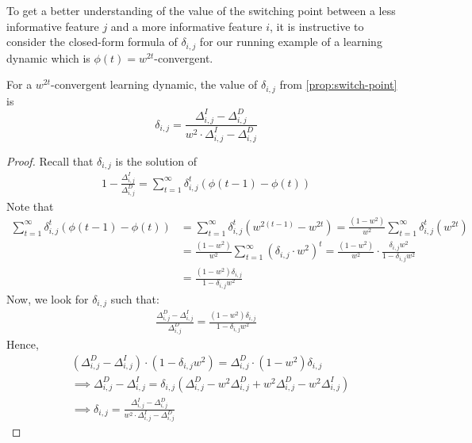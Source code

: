 To get a better understanding of the value of the switching point between a less informative feature $j$ and a more informative feature $i$, it is instructive to consider the closed-form formula of $\delta_{i,j}$ for our running example of a learning dynamic which is $\phi(t) = w^{2t}$-convergent. 

\begin{claim} \label{clm:educating-two-features}
For a $w^{2t}$-convergent learning dynamic, the value of $\delta_{i,j}$ from \cref{prop:switch-point} is
$$
 \delta_{i,j} 
 = 
 \frac{\Delta^I_{i,j} - \Delta^D_{i,j}}
 {w^2 \cdot \Delta^I_{i,j} - \Delta^D_{i,j}}
 $$
\end{claim}

\begin{proof}
Recall that $\delta_{i,j}$ is the solution of
\begin{align*} 
   1- \frac{\Delta^I_{i,j}}{\Delta^D_{i,j}} = \sum_{t=1}^\infty \delta_{i,j}^t (\phi(t-1)-\phi(t))
\end{align*}
Note that
\begin{align*}
     \sum_{t=1}^\infty \delta_{i,j}^t (\phi(t-1)-\phi(t)) &=  \sum_{t=1}^\infty \delta_{i,j}^t (w^{2(t-1)}-w^{2t}) 
     = \frac{(1-w^2)}{w^2}\sum_{t=1}^\infty \delta_{i,j}^t (w^{2t}) \\
     &= \frac{(1-w^2)}{w^2}\sum_{t=1}^\infty (\delta_{i,j} \cdot w^2)^t 
     = \frac{(1-w^2)}{w^2} \cdot\frac{\delta_{i,j}w^2}{1-\delta_{i,j}w^2} \\
     &= \frac{(1-w^2)\delta_{i,j}}{1-\delta_{i,j}w^2} 
\end{align*}
Now, we look for $\delta_{i,j}$ such that:
\begin{align*} 
\frac{\Delta^D_{i,j}-\Delta^I_{i,j}}{\Delta^D_{i,j}} = \frac{(1-w^2)\delta_{i,j}}{1-\delta_{i,j}w^2} 
\end{align*}
Hence,
\begin{align*} 
&(\Delta^D_{i,j}-\Delta^I_{i,j})\cdot(1-\delta_{i,j}w^2) = \Delta^D_{i,j} \cdot(1-w^2)\delta_{i,j} \\
&\implies \Delta^D_{i,j}-\Delta^I_{i,j} = \delta_{i,j} (\Delta^D_{i,j}-w^2 \Delta^D_{i,j} + w^2 \Delta^D_{i,j}-w^2 \Delta^I_{i,j}) \\
&\implies \delta_{i,j} = 
\frac{\Delta^I_{i,j} - \Delta^D_{i,j}}
{w^2 \cdot \Delta^I_{i,j} - \Delta^D_{i,j}}
\end{align*}
\end{proof}



